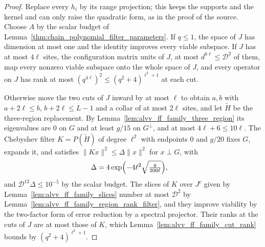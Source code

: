 \begin{proof}\leanok
    Replace every $h_i$ by its range projection; this keeps the supports and the
    kernel and can only raise the quadratic form, as in the proof of the source.
    Choose $A$ by the scalar budget of
    Lemma~\ref{thm:chain_polynomial_filter_parameters}. If $q\le1$, the space of
    $J$ has dimension at most one and the identity improves every viable
    subspace. If $J$ has at most $4\ell$ sites, the configuration matrix units of
    $J$, at most $d^{8\ell}\le\mathcal D^2$ of them, map every nonzero viable
    subspace onto the whole space of $J$, and every operator on $J$ has rank at
    most $(q^{4\ell})^2\le(q^2+4)^{\ell^2+1}$ at each cut.

    Otherwise move the two cuts of $J$ inward by at most $\ell$ to obtain $a,b$
    with $a+2\ell\le b$, $b+2\ell\le L-1$ and a collar of at most $2\ell$ sites,
    and let $\widetilde H$ be the three-region replacement. By
    Lemma~\ref{lem:alvv_ff_family_three_region} its eigenvalues are $0$ on
    $G$ and at least $g/15$ on $G^\perp$, and at most $4\ell+6\le10\ell$.
    The Chebyshev filter $K=P(\widetilde H)$ of degree $\ell^2$ with endpoints
    $0$ and $g/20$ fixes $G$, expands it, and satisfies
    $\|Kx\|^2\le\Delta\|x\|^2$ for $x\perp G$, with
    \begin{align}
        \Delta & =4\exp\Bigl(-4\ell^2\sqrt{\tfrac{g}{200\ell}}\Bigr),
        \label{eq:alvv_ff_family_contraction}
    \end{align}
    and $\mathcal D^{12}\Delta\le10^{-5}$ by the scalar budget. The slices of $K$
    over $J^c$ given by Lemma~\ref{lem:alvv_ff_family_slices} number at most
    $\mathcal D^2$ by Lemma~\ref{lem:alvv_ff_family_region_rank_filter}, and they
    improve viability by the two-factor form of error reduction by a spectral
    projector. Their ranks at the cuts of $J$ are at most those of $K$, which
    Lemma~\ref{lem:alvv_ff_family_cut_rank} bounds by $(q^2+4)^{\ell^2+1}$.
\end{proof}

